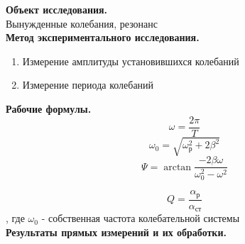 \documentclass[a4paper]{article}
\begin{document}
	{\parindent=0pt\textbf{Объект исследования.}}\\
	Вынужденные колебания, резонанс\\
	
	{\parindent=0pt\textbf{Метод экспериментального исследования.}}
	\begin{enumerate}
		\item Измерение амплитуды установившихся колебаний
		\item Измерение периода колебаний\\
	\end{enumerate}

	{\parindent=0pt\textbf{Рабочие формулы.}}\\
	
	\begin{equation}
		\omega = \frac{2\pi}{T}
	\end{equation}
		\begin{equation}
		 \omega_0 = \sqrt{\omega_\text{р}^2 + 2\beta^2}
	\end{equation}
			\begin{equation}
		 \Psi = \arctan{\frac{-2\beta\omega}{\omega_0^2 - \omega^2}}
	\end{equation}

\begin{equation}
	Q = \frac{\alpha_\text{р}}{\alpha_\text{ст}}
\end{equation}
, где $ \omega_0$ - собственная частота колебательной системы\\

{\parindent=0pt\textbf{Результаты прямых измерений и их обработки.}}\\
\end{document}

